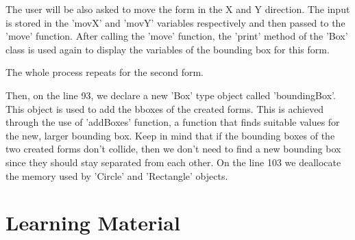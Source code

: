 \documentclass[a4paper, 10pt]{article}
\begin{document}
The user will be also asked to move the form in the X and Y direction. The input is stored in the 'movX' and 'movY' variables respectively and then passed to the 'move' function.
After calling the 'move' function, the 'print' method of the 'Box' class is used again to display the variables of the bounding box for this form.

The whole process repeats for the second form.

Then, on the line 93, we declare a new 'Box' type object called 'boundingBox'. This object is used to add the bboxes of the created forms. This is achieved through the use of 'addBoxes' function, a function that finds suitable values for the new, larger bounding box. Keep in mind that if the bounding boxes of the two created forms don't collide, then we don't need to find a new bounding box since they should stay separated from each other.
On the line 103 we deallocate the memory used by 'Circle' and 'Rectangle' objects.

\newpage
\section{Learning Material}

\end{document}
